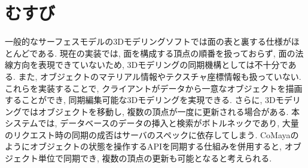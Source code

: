 \chapter{むすび} \label{chap:conclusion}
一般的なサーフェスモデルの3Dモデリングソフトでは面の表と裏する仕様がほとんどである.
現在の実装では, 面を構成する頂点の順番を扱っておらず, 面の法線方向を表現できていないため, 3Dモデリングの同期機構としては不十分である. また, オブジェクトのマテリアル情報やテクスチャ座標情報も扱っていない.
これらを実装することで, クライアントがデータから一意なオブジェクトを描画することができ, 同期編集可能な3Dモデリングを実現できる.
さらに, 3Dモデリングではオブジェクトを移動し, 複数の頂点が一度に更新される場合がある. 本システムでは, データベースのデータの挿入と検索がボトルネックであり, 大量のリクエスト時の同期の成否はサーバのスペックに依存してしまう. CoMayaのようにオブジェクトの状態を操作するAPIを同期する仕組みを併用すると, オブジェクト単位で同期でき, 複数の頂点の更新も可能となると考えられる.

